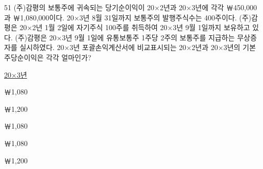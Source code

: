\begin{question}{51}
(주)감평의 보통주에 귀속되는 당기순이익이 20×2년과 20×3년에 각각 ￦450,000과 ￦1,080,000이다. 20×3년 8월 31일까지 보통주의 발행주식수는 400주이다. (주)감평은 20×2년 1월 2일에 자기주식 100주를 취득하여 20×3년 9월 1일까지 보유하고 있다. (주)감평은 20×3년 9월 1일에 유통보통주 1주당 2주의 보통주를 지급하는 무상증자를 실시하였다. 20×3년 포괄손익계산서에 비교표시되는 20×2년과 20×3년의 기본주당순이익은 각각 얼마인가?

\noindent\hspace*{2em}\uline{20×3년}\par
\begin{choices}
  \item {}￦1,080
  \item {}￦1,200
  \item {}￦1,080
  \item {}￦1,080
  \item {}￦1,200
\end{choices}
\end{question}
